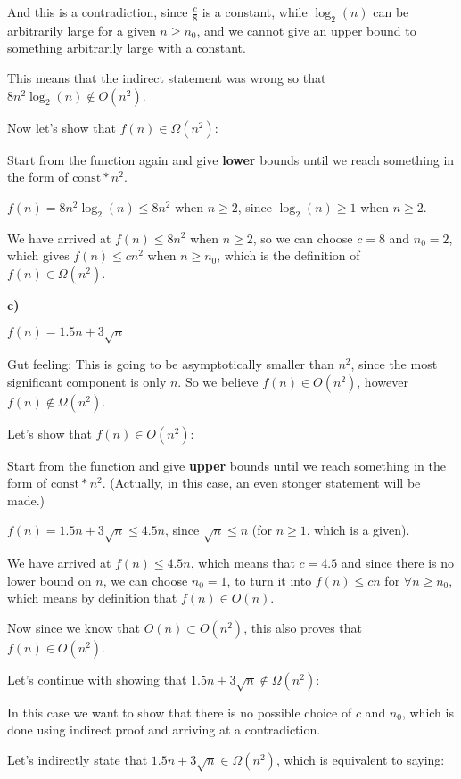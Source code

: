 And this is a contradiction, since $\frac{c}{8}$ is a constant, while $\log_2(n)$ can be arbitrarily large for a given $n\geq{}n_0$, and we cannot give an upper bound to something arbitrarily large with a constant.

This means that the indirect statement was wrong so that $8n^2\log_2(n)\notin{}O(n^2)$.

Now let's show that $f(n)\in{}\Omega(n^2)$:

Start from the function again and give \textbf{lower} bounds until we reach something in the form of $\text{const}*n^2$.

$f(n) = 8n^2\log_2(n) \leq{} 8n^2$ when $n\geq{}2$, since $\log_2(n) \geq{} 1$ when $n\geq{}2$.

We have arrived at $f(n) \leq{} 8n^2$ when $n\geq{}2$, so we can choose $c=8$ and $n_0=2$, which gives $f(n) \leq{} cn^2$ when $n\geq{}n_0$, which is the definition of $f(n)\in{}\Omega(n^2)$.


\textbf{c)}

$f(n) = 1.5n + 3\sqrt{n}$

Gut feeling: This is going to be asymptotically smaller than $n^2$, since the most significant component is only $n$. So we believe $f(n)\in{}O(n^2)$, however $f(n)\notin{}\Omega(n^2)$.

Let's show that $f(n)\in{}O(n^2)$:

Start from the function and give \textbf{upper} bounds until we reach something in the form of $\text{const}*n^2$. (Actually, in this case, an even stonger statement will be made.)

$f(n) = 1.5n + 3\sqrt{n} \leq{} 4.5n$, since $\sqrt{n} \leq{} n$ (for $n\geq{}1$, which is a given).

We have arrived at $f(n) \leq{} 4.5n$, which means that $c=4.5$ and since there is no lower bound on $n$, we can choose $n_0=1$, to turn it into $f(n) \leq{} cn$ for $\forall{}n\geq{}n_0$, which means by definition that $f(n)\in{}O(n)$. 

Now since we know that $O(n)\subset{}O(n^2)$, this also proves that $f(n)\in{}O(n^2)$.

Let's continue with showing that $1.5n + 3\sqrt{n}\notin{}\Omega(n^2)$:

In this case we want to show that there is no possible choice of $c$ and $n_0$, which is done using indirect proof and arriving at a contradiction.

Let's indirectly state that $1.5n + 3\sqrt{n}\in{}\Omega(n^2)$, which is equivalent to saying:

